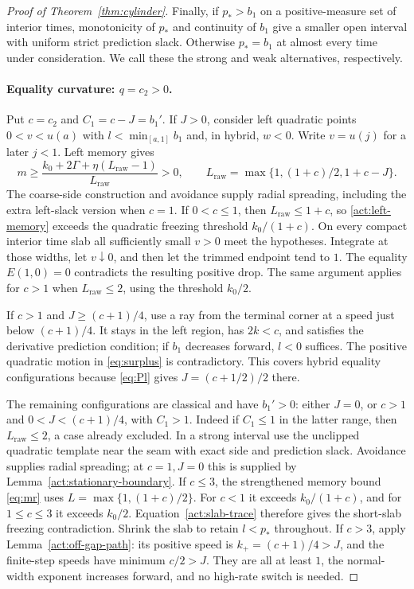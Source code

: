 \begin{proof}[Proof of Theorem~\ref{thm:cylinder}]
Finally, if $p_*>b_1$ on a positive-measure set of interior times,
monotonicity of $p_*$ and continuity of $b_1$ give a smaller open
interval with uniform strict prediction slack.  Otherwise
$p_*=b_1$ at almost every time under consideration.  We call
these the strong and weak alternatives, respectively.

\paragraph{Equality curvature: $q=c_2>0$.}
Put $c=c_2$ and $C_1=c-J=b_1'$.  If $J>0$, consider left
quadratic points $0<v<u(a)$ with
$l<\min_{[a,1]}b_1$ and, in hybrid, $w<0$.
Write $v=u(j)$ for a later $j<1$.  Left memory gives
\begin{equation}\label{act:left-memory}
 m\ge\frac{k_0+2\Gamma+\eta(L_{\mathrm{raw}}-1)}
               {L_{\mathrm{raw}}}>0,
 \qquad
 L_{\mathrm{raw}}=\max\{1,(1+c)/2,1+c-J\}.
\end{equation}
The coarse-side construction and avoidance supply radial spreading,
including the extra left-slack version when $c=1$.
If $0<c\le1$, then $L_{\mathrm{raw}}\le1+c$, so
\eqref{act:left-memory} exceeds the quadratic freezing threshold
$k_0/(1+c)$.  On every compact interior time slab all sufficiently
small $v>0$ meet the hypotheses.  Integrate at those widths,
let $v\downarrow0$, and then let the trimmed endpoint tend to
$1$.  The equality $E(1,0)=0$ contradicts the resulting positive
drop.  The same argument applies for $c>1$ when
$L_{\mathrm{raw}}\le2$, using the threshold $k_0/2$.

If $c>1$ and $J\ge(c+1)/4$, use a ray from the terminal corner
at a speed just below $(c+1)/4$.  It stays in the left region,
has $2k<c$, and satisfies the derivative prediction condition;
if $b_1$ decreases forward, $l<0$ suffices.  The positive
quadratic motion in \eqref{eq:surplus} is contradictory.
This covers hybrid equality configurations because
\eqref{eq:Pl} gives $J=(c+1/2)/2$ there.

The remaining configurations are classical and have $b_1'>0$:
either $J=0$, or $c>1$ and
$0<J<(c+1)/4$, with $C_1>1$.  Indeed if $C_1\le1$ in the
latter range, then $L_{\mathrm{raw}}\le2$, a case already excluded.
In a strong interval use the unclipped quadratic template near
the seam with exact side and prediction slack.  Avoidance supplies
radial spreading; at $c=1,J=0$ this is supplied by
Lemma~\ref{act:stationary-boundary}.  If $c\le3$, the strengthened
memory bound \eqref{eq:mr} uses $L=\max\{1,(1+c)/2\}$.
For $c<1$ it exceeds $k_0/(1+c)$, and for $1\le c\le3$ it
exceeds $k_0/2$.  Equation~\eqref{act:slab-trace} therefore
gives the short-slab freezing contradiction.  Shrink the slab
to retain $l<p_*$ throughout.  If $c>3$, apply
Lemma~\ref{act:off-gap-path}: its positive speed is
$k_+=(c+1)/4>J$, and the finite-step speeds have minimum
$c/2>J$.  They are all at least $1$, the normal-width exponent increases
forward, and no high-rate switch is needed.


\end{proof}
